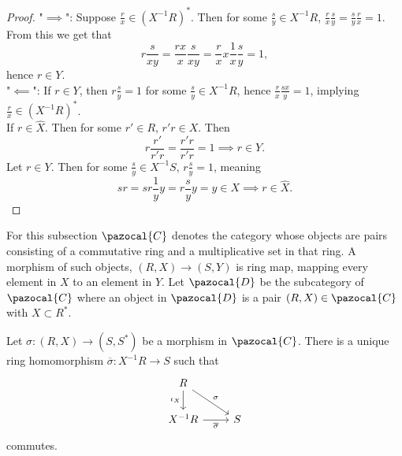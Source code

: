 \begin{proof}
    "$\implies$": Suppose $\frac{r}{x}\in \left(X^{-1}R\right)^\ast$. Then for some $\frac{s}{y}\in X^{-1}R$, $\frac{r}{x}\frac{s}{y}=\frac{s}{y}\frac{r}{x}=1$.  From this we get that 
    $$r \frac{s}{xy} = \frac{rx}{x}\frac{s}{xy}= \frac{r}{x}x\frac{1}{x}\frac{s}{y} = 1,$$
    hence $r\in Y$.\\
    "$\impliedby$": If $r \in Y$, then $r \frac{s}{y}=1$ for some $\frac{s}{y}\in X^{-1}R$, hence $\frac{r}{x}\frac{sx}{y} = 1$, implying $\frac{r}{x} \in \left( X^{-1}R\right)^\ast$.\\
    If $r \in \widehat{X}$. Then for some $r'\in R$, $r'r\in X$. Then 
    $$r\frac{r'}{r'r} = \frac{r'r}{r'r} = 1 \implies r\in Y.$$
    Let $r \in Y$. Then for some $\frac{s}{y}\in X^{-1}S$, $r\frac{s}{y}=1$, meaning
    $$sr = sr \frac{1}{y}y = r\frac{s}{y}y= y \in X \implies r \in \widehat{X}.$$
\end{proof}
For this subsection $\pazocal{C}$ denotes the category whose objects are pairs consisting of a commutative ring and a multiplicative set in that ring. A morphism of such objects, $(R,X)\rightarrow (S,Y)$ is ring map, mapping every element in $X$ to an element in $Y$. Let $\pazocal{D}$ be the subcategory of $\pazocal{C}$ where an object in $\pazocal{D}$ is a pair $(R,X)\in \pazocal{C}$ with $X\subset R^\ast$.
    \begin{lemma}
        Let $\sigma:(R,X)\rightarrow (S,S^\ast)$ be a morphism in $\pazocal{C}$. There is a unique ring homomorphism $\overline{\sigma}: X^{-1}R\rightarrow S$ such that 
        $$
            \begin{tikzcd}
                R \arrow[d,"\iota_X"']\arrow[rd, "\sigma"]\\
                X^{-1}R \arrow[r,"\overline{\sigma}"'] & S
            \end{tikzcd}
        $$
        commutes. 
    \end{lemma}  
